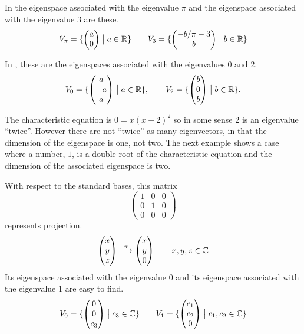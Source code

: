 \begin{example}
In  the eigenspace associated with the
eigenvalue \( \pi \) 
and the eigenspace associated with the eigenvalue \( 3 \) are these.
\begin{equation*}
  V_{\pi}=\mbox{$\{\begin{pmatrix} a \\ 0 \end{pmatrix}\bigm| a\in\mathbb{R}\}$}
  \qquad
  V_3=\mbox{$\{\begin{pmatrix} -b/\pi-3 \\ b \end{pmatrix}\bigm| b\in\mathbb{R}\}$}
\end{equation*}
\end{example}

\begin{example}
In ,
these are the eigenspaces associated with the eigenvalues \( 0 \) 
and \( 2 \).
\begin{equation*}
  V_0=\mbox{$\{\begin{pmatrix} a \\ -a \\ a \end{pmatrix}\bigm| a\in\mathbb{R}\}$},
  \qquad
  V_2=\mbox{$\{\begin{pmatrix} b \\ 0 \\ b \end{pmatrix}\bigm| b\in\mathbb{R}\}$}.
\end{equation*}
\end{example}

\begin{remark}
The characteristic equation is \( 0=x(x-2)^2 \) so in some sense
\( 2 \) is an eigenvalue ``twice''.
However there are not ``twice'' as many eigenvectors, in that the dimension
of the eigenspace is one, not two.
The next example shows a case where a number, \( 1 \), is a double root of
the characteristic equation and the dimension of the associated eigenspace
is two.
\end{remark}

\begin{example}
With respect to the standard bases, this matrix
\begin{equation*}
  \begin{pmatrix}
     1  &0  &0  \\
     0  &1  &0  \\
     0  &0  &0
  \end{pmatrix}
\end{equation*}
represents projection.
\begin{equation*}
  \begin{pmatrix} x \\ y \\ z \end{pmatrix}
     \stackrel{\pi}{\longmapsto}
  \begin{pmatrix} x \\ y \\ 0 \end{pmatrix}
   \qquad x,y,z\in\mathbb{C}
\end{equation*}
Its eigenspace associated with the eigenvalue \( 0 \) and
its eigenspace associated with the eigenvalue \( 1 \)
are easy to find.
\begin{equation*}
   V_0=\mbox{$\{\begin{pmatrix} 0 \\ 0 \\ c_3 \end{pmatrix}\bigm| c_3\in\mathbb{C}\}$}
   \qquad
   V_1=\mbox{$\{\begin{pmatrix} c_1 \\ c_2 \\ 0 \end{pmatrix}\bigm| c_1,c_2\in\mathbb{C}\}$}
\end{equation*}
\end{example}

